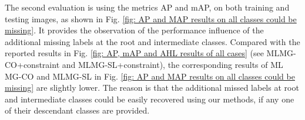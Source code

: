 \documentclass[twocolumn]{svjour3}          %
\begin{document}
\begin{table*}[phtb] %
\caption{ Runtime in seconds of all compared methods. The smallest runtime of each dataset is highlighted in bold.}
\label{table: running time}
\begin{center}
\end{center}
\end{table*}


The second evaluation is using the metrics AP and mAP, on both training and testing images, as shown in Fig. \ref{fig: AP and MAP results on all classes could be missing}.  It provides the observation of the performance influence of the additional missing labels at the root and intermediate classes. 
Compared with the reported results in Fig. \ref{fig: AP, mAP and AHL results of all cases} (see MLMG-CO+constraint and MLMG-SL+constraint), the corresponding results of 
ML MG-CO and MLMG-SL in Fig. \ref{fig: AP and MAP results on all classes could be missing} are slightly lower. The reason is that the additional missed labels at root and intermediate classes could be easily recovered using our methods, if any one of their descendant classes are provided. 
\end{document}

